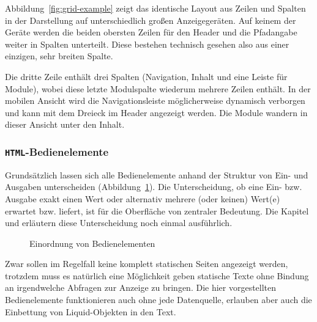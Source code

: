Abbildung~\ref{fig:grid-example} zeigt das identische Layout aus Zeilen und Spalten in der Darstellung auf unterschiedlich großen Anzeigegeräten. Auf keinem der Geräte werden die beiden obersten Zeilen für den Header und die Pfadangabe weiter in Spalten unterteilt. Diese bestehen technisch gesehen also aus einer einzigen, sehr breiten Spalte.

Die dritte Zeile enthält drei Spalten (Navigation, Inhalt und eine Leiste für Module), wobei diese letzte Modulspalte wiederum mehrere Zeilen enthält. In der mobilen Ansicht wird die Navigationsleiste möglicherweise dynamisch verborgen und kann mit dem Dreieck im Header angezeigt werden. Die Module wandern in dieser Ansicht unter den Inhalt.

\subsubsection{\texttt{HTML}-Bedienelemente}

Grundsätzlich lassen sich alle Bedienelemente anhand der Struktur von Ein- und Ausgaben unterscheiden (Abbildung~\ref{fig:ui-element-concept}). Die Unterscheidung, ob eine Ein- bzw. Ausgabe exakt einen Wert oder alternativ mehrere (oder keinen) Wert(e) erwartet bzw. liefert, ist für die Oberfläche von zentraler Bedeutung. Die Kapitel  und  erläutern diese Unterscheidung noch einmal ausführlich.

\begin{figure}[h]
  \centering 
  \caption{Einordnung von Bedienelementen}
  \label{fig:ui-element-concept}
\end{figure}

Zwar sollen im Regelfall keine komplett statischen Seiten angezeigt werden, trotzdem muss es natürlich eine Möglichkeit geben statische Texte ohne Bindung an irgendwelche Abfragen zur Anzeige zu bringen. Die hier vorgestellten Bedienelemente funktionieren auch ohne jede Datenquelle, erlauben aber auch die Einbettung von Liquid-Objekten in den Text.

